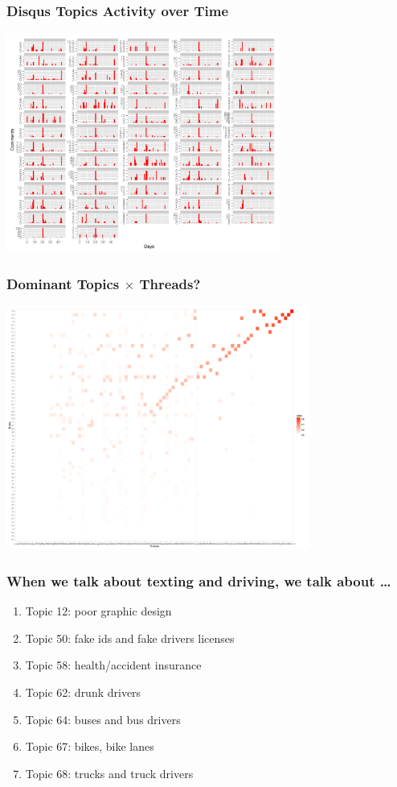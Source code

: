 \documentclass{beamer}
\begin{document}
\begin{frame}\frametitle{Disqus Topics Activity over Time}
  \begin{center}
    \includegraphics[width=9cm]{./imgs/timebycluster.pdf}
  \end{center}
\end{frame}

\begin{frame}\frametitle{Dominant Topics $\times$ Threads?}
  \begin{center}
    \includegraphics[width=10cm]{./imgs/gg_heat.pdf}
  \end{center}
\end{frame}

\begin{frame}\frametitle{When we talk about texting and driving, we talk about \ldots}
\begin{center}
{\Large 
\begin{enumerate}
\item Topic 12: poor graphic design
\item Topic 50: fake ids and fake drivers licenses
\item Topic 58: health/accident insurance
\item Topic 62: drunk drivers
\item Topic 64: buses and bus drivers
\item Topic 67: bikes, bike lanes
\item Topic 68: trucks and truck drivers
\end{enumerate}
}
\end{center}
\end{frame}
\end{document}
